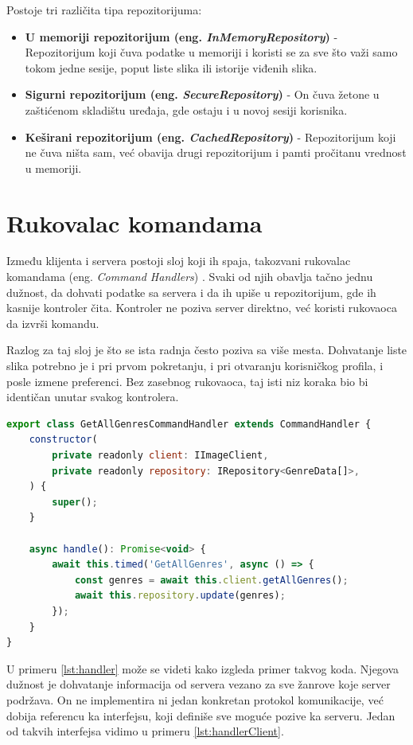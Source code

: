 \documentclass[12pt,oneside]{memoir}
\begin{document}
Postoje tri različita tipa repozitorijuma:
\begin{itemize}
\item \textbf{U memoriji repozitorijum (eng. \textit{InMemoryRepository})} - Repozitorijum koji čuva podatke u memoriji
i koristi se za sve što važi samo tokom jedne sesije, poput liste slika ili
istorije viđenih slika.
\item \textbf{Sigurni repozitorijum (eng. \textit{SecureRepository})} - On čuva žetone u zaštićenom
skladištu uređaja, gde ostaju i u novoj sesiji korisnika.
\item \textbf{Keširani repozitorijum (eng. \textit{CachedRepository})} - Repozitorijum koji ne čuva ništa sam,
 već obavija drugi repozitorijum i
pamti pročitanu vrednost u memoriji.
\end{itemize}


\section{Rukovalac komandama}
Između klijenta i servera postoji sloj koji ih spaja, takozvani rukovalac komandama (eng. \textit{Command Handlers}) \cite{gof1994}. 
Svaki od njih obavlja tačno jednu dužnost, da dohvati podatke sa servera i da ih upiše u repozitorijum, gde ih 
kasnije kontroler čita. Kontroler ne poziva server direktno, već koristi rukovaoca da izvrši komandu. 

Razlog za taj sloj je što se ista radnja često poziva sa više mesta. Dohvatanje
liste slika potrebno je i pri prvom pokretanju, i pri otvaranju korisničkog
profila, i posle izmene preferenci. Bez zasebnog rukovaoca, taj isti niz koraka bio bi
identičan unutar svakog kontrolera.

\begin{lstlisting}[language=JavaScript,
  caption={Rukovalac komandom za dohvatanje žanrova},
  label={lst:handler}]
export class GetAllGenresCommandHandler extends CommandHandler {
    constructor(
        private readonly client: IImageClient,
        private readonly repository: IRepository<GenreData[]>,
    ) {
        super();
    }

    async handle(): Promise<void> {
        await this.timed('GetAllGenres', async () => {
            const genres = await this.client.getAllGenres();
            await this.repository.update(genres);
        });
    }
}
\end{lstlisting}

U primeru \ref{lst:handler} može se videti kako izgleda primer takvog koda. Njegova dužnost je dohvatanje 
informacija od servera vezano za sve žanrove koje server podržava. On ne implementira ni jedan konkretan protokol komunikacije, 
već dobija referencu ka interfejsu, koji definiše sve moguće pozive ka serveru. 
Jedan od takvih interfejsa vidimo u primeru \ref{lst:handlerClient}.
\end{document}
